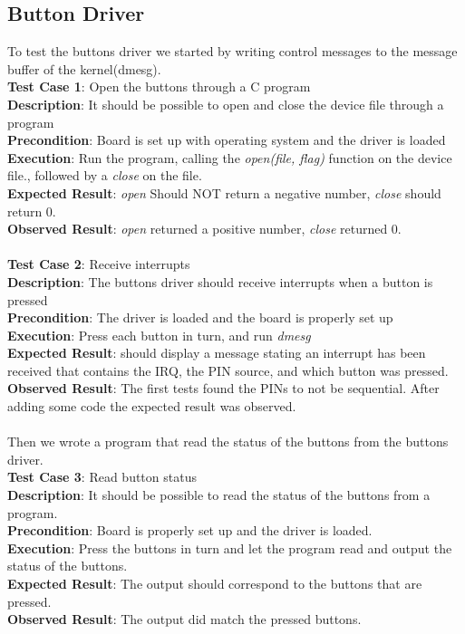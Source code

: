 \subsection{Button Driver}
To test the buttons driver we started by writing control messages to the message buffer of the kernel(dmesg). 
\\
{\bf Test Case 1}: Open the buttons through a C program \\
{\bf Description}: It should be possible to open and close the device file through a program \\
{\bf Precondition}: Board is set up with operating system and the driver is loaded\\
{\bf Execution}: Run the program, calling the {\it open(file, flag)} function on the device
file., followed by a {\it close} on the file.\\
{\bf Expected Result}: {\it open} Should NOT return a negative number, {\it close}
should return 0.\\
{\bf Observed Result}: {\it open} returned a positive number, {\it close}
returned 0. \\
 \\
{\bf Test Case 2}: Receive interrupts \\
{\bf Description}: The buttons driver should receive interrupts when a button is pressed \\
{\bf Precondition}: The driver is loaded and the board is properly set up\\
{\bf Execution}: Press each button in turn, and run {\it dmesg}\\
{\bf Expected Result}: should display a message stating an interrupt has been received that contains the IRQ, the PIN source, and which button was pressed.\\
{\bf Observed Result}: The first tests found the PINs to not be sequential.  After adding some code the expected result was observed.\\

\\Then we wrote a program that read the status of the buttons from the buttons driver.
\\
{\bf Test Case 3}: Read button status \\
{\bf Description}: It should be possible to read the status of the buttons from a program. \\
{\bf Precondition}: Board is properly set up and the driver is loaded. \\
{\bf Execution}: Press the buttons in turn and let the program read and output the status of the buttons.\\
{\bf Expected Result}: The output should correspond to the buttons that are pressed.\\
{\bf Observed Result}:  The output did match the pressed buttons.\\
 \\

